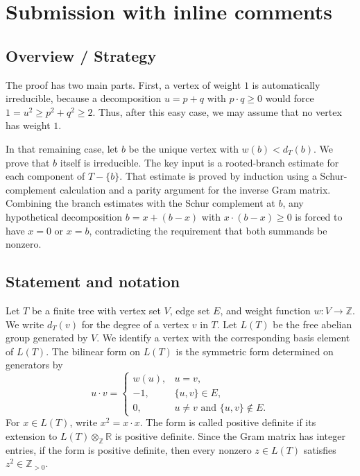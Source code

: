 \documentclass[12pt]{article}
\newcommand{\Z}{\mathbb{Z}}
\begin{document}
  \section{Submission with inline comments}


\date{}



\subsection*{Overview / Strategy}

The proof has two main parts. First, a vertex of weight \(1\) is automatically irreducible, because a decomposition \(u=p+q\) with \(p\cdot q\ge 0\) would force \(1=u^2\ge p^2+q^2\ge 2\). Thus, after this easy case, we may assume that no vertex has weight \(1\).

In that remaining case, let \(b\) be the unique vertex with \(w(b)<d_T(b)\). We prove that \(b\) itself is irreducible. The key input is a rooted-branch estimate for each component of \(T-\{b\}\). That estimate is proved by induction using a Schur-complement calculation and a parity argument for the inverse Gram matrix. Combining the branch estimates with the Schur complement at \(b\), any hypothetical decomposition \(b=x+(b-x)\) with \(x\cdot(b-x)\ge0\) is forced to have \(x=0\) or \(x=b\), contradicting the requirement that both summands be nonzero.

\subsection*{Statement and notation}

Let \(T\) be a finite tree with vertex set \(V\), edge set \(E\), and weight function \(w:V\to\Z\). We write \(d_T(v)\) for the degree of a vertex \(v\) in \(T\). Let \(L(T)\) be the free abelian group generated by \(V\). We identify a vertex with the corresponding basis element of \(L(T)\). The bilinear form on \(L(T)\) is the symmetric form determined on generators by
\[
u\cdot v=
\begin{cases}
w(u), & u=v,\\
-1, & \{u,v\}\in E,\\
0, & u\ne v \text{ and } \{u,v\}\notin E.
\end{cases}
\]
For \(x\in L(T)\), write \(x^2=x\cdot x\). The form is called positive definite if its extension to \(L(T)\otimes_{\Z}\mathbb R\) is positive definite. Since the Gram matrix has integer entries, if the form is positive definite, then every nonzero \(z\in L(T)\) satisfies \(z^2\in\Z_{>0}\).
\end{document}
